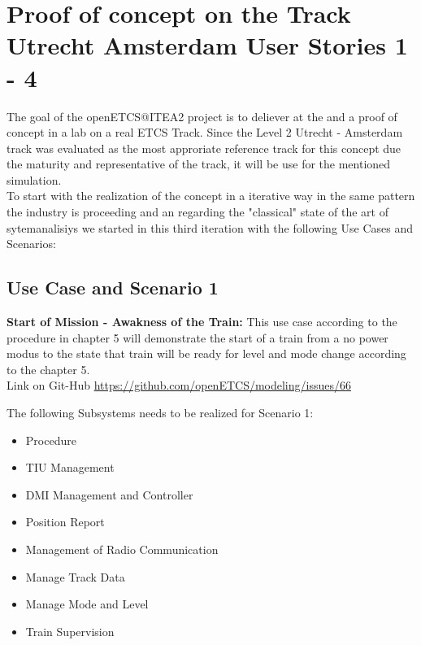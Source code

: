 
\section{Proof of concept on the Track Utrecht Amsterdam User Stories 1 - 4}

The goal of the openETCS@ITEA2 project is to deliever at the and a proof of concept in a lab on a real ETCS Track. Since the Level 2 Utrecht - Amsterdam track was evaluated as the most approriate reference track for this concept due the maturity and representative of the track, it will be use for the mentioned simulation.\\

To start with the realization of the concept in a iterative way in the same pattern the industry is proceeding and an regarding the "classical" state of the art of sytemanalisiys we started in this third iteration with the following Use Cases and Scenarios:\\

\subsection{Use Case and Scenario 1}
\textbf{Start of Mission - Awakness of the Train:}
This use case according to the procedure in chapter 5 will demonstrate the start of a train from a no power modus to the state that train will be ready for level and mode change according to the chapter 5.\\ 
Link on Git-Hub \url{https://github.com/openETCS/modeling/issues/66}

The following Subsystems needs to be realized for Scenario 1:\\
\begin{itemize}
\item Procedure
\item TIU Management
\item DMI Management and Controller
\item Position Report
\item Management of Radio Communication
\item Manage Track Data
\item Manage Mode and Level
\item Train Supervision
\end{itemize}

